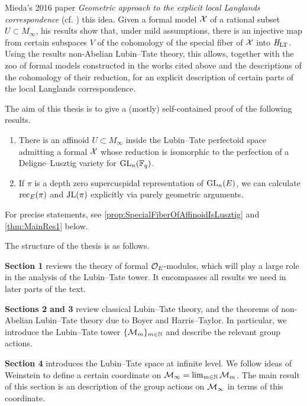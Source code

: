 \documentclass[../main.tex]{subfiles}
\begin{document}
Mieda's 2016 paper \textit{Geometric
  approach to the explicit local Langlands correspondence} (cf.
  \cite{mieda2016geometric}) this idea. Given a formal model $\mathcal{X}$ of a
  rational subset $U \subset M_\infty$, his results show that, under
mild assumptions, there is an injective map
from certain subspaces $V$ of the cohomology of the 
special fiber of $\mathcal{X}$ into $\mathit H_{\mathrm{LT}}$. Using the results non-Abelian
Lubin--Tate theory, this allows, together with the zoo of formal models
constructed in the works cited above and the descriptions of the cohomology of their
reduction, for an explicit description of certain parts of the local Langlands
correspondence.

The aim of this thesis is to give a (mostly) self-contained proof of
the following results.
\begin{thm*}
  \leavevmode \begin{enumerate}
    \item There is an affinoid $U \subset M_\infty$ inside the Lubin--Tate perfectoid
      space admitting a formal $\mathcal{X}$ whose reduction is isomorphic to the
      perfection of a Deligne--Lusztig variety for $\operatorname{GL}_n(\mathbb{F}_q)$.
    \item If $\pi$ is a depth zero supercuspidal representation of $\operatorname{GL}_n(E)$, 
      we can calculate $\mathrm{rec}_E(\pi)$ and $\mathrm{JL}(\pi)$ explicitly via purely geometric
      arguments.
  \end{enumerate}
\end{thm*}
For precise statements, see \cref{prop:SpecialFiberOfAffinoidIsLusztig}
and \cref{thm:MainRes1} below. 

The structure of the thesis is as follows.

\textbf{Section 1} reviews the theory of formal $\mathcal{O}_E$-modules, which
will play a large role in the analysis of the Lubin--Tate tower. It encompasses
all results we need in later parts of the text.

\textbf{Sections 2 and 3} review classical Lubin--Tate theory, and the theorems
of non-Abelian Lubin--Tate theory due to Boyer and Harris--Taylor. In particular,
we introduce the Lubin--Tate tower $\{\mathcal{M}_m\}_{m \in \mathbb{N}}$ and describe the
relevant group actions.

\textbf{Section 4} introduces the Lubin--Tate space at infinite level. 
We follow ideas of Weinstein to define a certain coordinate on $\mathcal{M}_\infty = 
\lim_{m \in \mathbb{N}} \mathcal{M}_m$. The main result of this section is an description of
the group actions on $\mathcal{M}_\infty$ in terms of this coordinate. 
\end{document}
